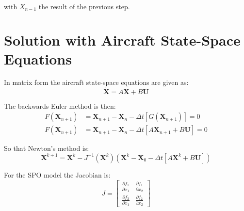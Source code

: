 \documentclass[11pt]{article}
\begin{document}
with $X_{n-1}$ the result of the previous step.
\section{Solution with Aircraft State-Space Equations}
In matrix form the aircraft state-space equations are given as:
\begin{equation}
  \dot{\mathbf{X}} = A\mathbf{X} + B\mathbf{U}
\end{equation}

The backwards Euler method is then:
\begin{subequations}
  \begin{align}
    F(\mathbf{X}_{n+1}) &= \mathbf{X}_{n+1} - \mathbf{X}_n - \Delta t \left[G\left(\mathbf{X}_{n+1}\right)\right] = 0 \\
    F(\mathbf{X}_{n+1}) &= \mathbf{X}_{n+1} - \mathbf{X}_n - \Delta t \left[A \mathbf{X}_{n+1} + B \mathbf{U}\right] = 0
  \end{align}
\end{subequations}

So that Newton's method is:
\begin{equation}
    \mathbf{X}^{k+1} = \mathbf{X}^k - J^{-1}({\mathbf{X}^k})\left(\mathbf{X}^k - \mathbf{X}_0 - \Delta t \left[A \mathbf{X}^k + B \mathbf{U}\right]\right)
\end{equation}

For the SPO model the Jacobian is:
\begin{equation}
  J =
  \begin{bmatrix}
    \frac{\partial f_1}{\partial x_1} & \frac{\partial f_1}{\partial x_2} \\
    \frac{\partial f_2}{\partial x_1} & \frac{\partial f_2}{\partial x_2}
  \end{bmatrix}
\end{equation}
\end{document}
